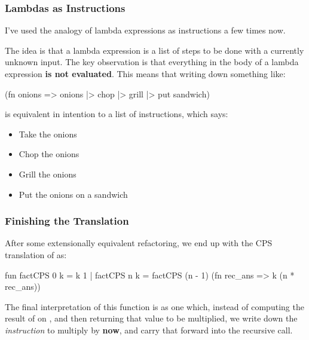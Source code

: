 \documentclass[aspectratio=169, handout]{beamer}
\begin{document}
\begin{frame}[fragile]
  \frametitle{Lambdas as Instructions}

  I've used the analogy of lambda expressions as instructions a few times now.

  \pause
  \vspace{\fill}

  The idea is that a lambda expression is a list of steps to be done with a
  currently unknown input. The key observation is that everything in the body
  of a lambda expression \textbf{is not evaluated}. This means that writing
  down something like:

  \begin{codeblock}
    (fn onions => onions |> chop |> grill |> put sandwich)
  \end{codeblock}

  is equivalent in intention to a list of instructions, which says:
  \begin{itemize}
    \item Take the onions
    \item Chop the onions
    \item Grill the onions
    \item Put the onions on a sandwich
  \end{itemize}
\end{frame}

\begin{frame}[fragile]
  \frametitle{Finishing the Translation}

  After some extensionally equivalent refactoring, we end up with the
  CPS translation of  as:

  \begin{codeblock}
    fun factCPS 0 k = k 1
      | factCPS n k =
          factCPS (n - 1) (fn rec_ans => k (n * rec_ans))
  \end{codeblock}

  \pause
  \vspace{\fill}

  The final interpretation of this function is as one which, instead of
  computing the result of  on , and then returning
  that value to be multiplied, we write down the \textit{instruction} to
  multiply by  \textbf{now}, and carry that forward into the
  recursive call.
\end{frame}
\end{document}
